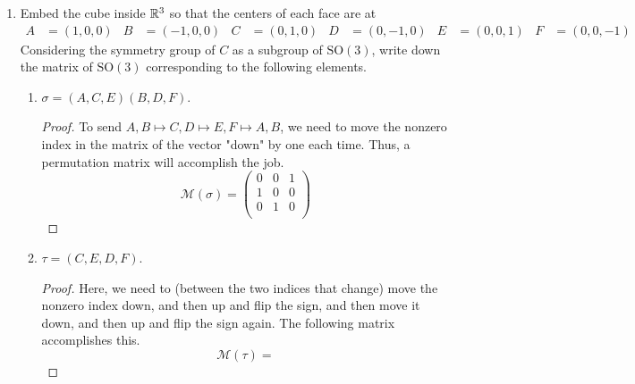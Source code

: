 \documentclass[../psets.tex]{subfiles}
\begin{document}
\begin{enumerate}
\begin{enumerate}
\begin{proof}
            By part (f), any rigid motion of $D$ permutes the 5 cubes, and is thus an element of $S_5$. Moreover, said rigid motion must correspond to a positive-determinant matrix element of $\text{SO}(3)$. Thus, since half of $S_5$ maps to $\text{SO}(3)$ and the other half maps to $\text{O}(3)\setminus\text{SO}(3)$, and $|S_5|=120$, we know that the symmetry group of the dodecahedron is a subgroup (like $\text{SO}(3)\leq\text{O}(3)$) of $S_5$ of order $120/2=60$.
        \end{proof}
    \end{enumerate}
    \item Embed the cube inside $\mathbb{R}^3$ so that the centers of each face are at
    \begin{align*}
        A &= (1,0,0)&
        B &= (-1,0,0)&
        C &= (0,1,0)&
        D &= (0,-1,0)&
        E &= (0,0,1)&
        F &= (0,0,-1)
    \end{align*}
    Considering the symmetry group of $C$ as a subgroup of $\text{SO}(3)$, write down the matrix of $\text{SO}(3)$ corresponding to the following elements.
    \begin{enumerate}
        \item $\sigma=(A,C,E)(B,D,F)$.
        \begin{proof}
            To send $A,B\mapsto C,D\mapsto E,F\mapsto A,B$, we need to move the nonzero index in the matrix of the vector "down" by one each time. Thus, a permutation matrix will accomplish the job.
            \begin{equation*}
                \boxed{\mathcal{M}(\sigma) =
                    \begin{pmatrix}
                        0 & 0 & 1\\
                        1 & 0 & 0\\
                        0 & 1 & 0\\
                    \end{pmatrix}
                }
            \end{equation*}
        \end{proof}
        \item $\tau=(C,E,D,F)$.
        \begin{proof}
            Here, we need to (between the two indices that change) move the nonzero index down, and then up and flip the sign, and then move it down, and then up and flip the sign again. The following matrix accomplishes this.
            \begin{equation*}
                \boxed{\mathcal{M}(\tau) =
}
\end{equation*}
\end{proof}
\end{enumerate}
\end{enumerate}
\end{document}
